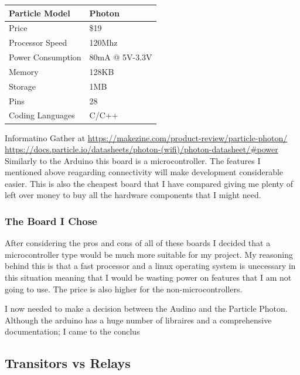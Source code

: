 \documentclass{article}
\begin{document}
\begin{tabularx}{\textwidth}{| X | X |}
    \hline
    Particle Model   &    Photon     \\ \hline
    Price            &     \$19      \\ \hline
    Processor Speed  &    120Mhz     \\ \hline
    Power Consumption& 80mA @ 5V-3.3V\\ \hline
    Memory           &    128KB      \\ \hline
    Storage          &     1MB       \\ \hline
    Pins             &     28        \\ \hline
    Coding Languages &    C/C++      \\ \hline
\end{tabularx}
\newline

Informatino Gather at \url{https://makezine.com/product-review/particle-photon/}
\url{https://docs.particle.io/datasheets/photon-(wifi)/photon-datasheet/#power} \\


Similarly to the Arduino this board is a microcontroller. The features I mentioned above reagarding
connectivity will make development considerable easier. This is also the cheapest board that I have
compared giving me plenty of left over money to buy all the hardware components that I might need.


\subsubsection{The Board I Chose}

After considering the pros and cons of all of these boards I decided that a microcontroller type
would be much more suitable for my project. My reasoning behind this is that a fast processor and
a linux operating system is unecessary in this situation meaning that I would be wasting power on
features that I am not going to use. The price is also higher for the non-microcontrollers.

I now needed to make a decision between the Audino and the Particle Photon. Although the arduino has
a huge number of libraires and a comprehensive documentation; I came to the conclus

\subsection{Transitors vs Relays}
\end{document}
